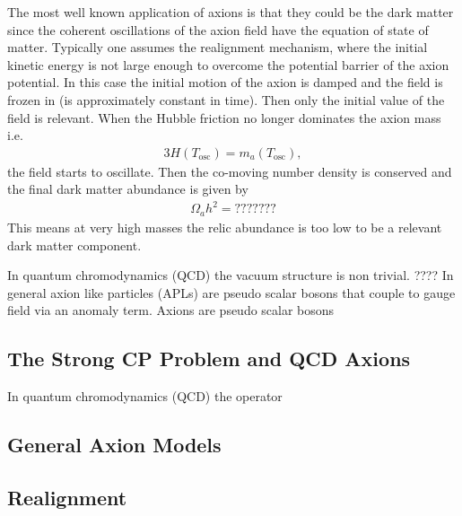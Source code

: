 \documentclass[13pt,a4paper,twoside,titlepage]{article}
\begin{document}
The most well known application of axions is that they could be the dark matter since
the coherent oscillations of the axion field have the equation of state of matter.
Typically one assumes the realignment mechanism, where the initial kinetic energy is not large enough to overcome the potential barrier of the axion potential. In this case the initial motion of the axion is damped and the field is frozen in (is approximately constant in time). Then only the initial value of the field is relevant.
When the Hubble friction no longer dominates the axion mass i.e.
\begin{align}
    3H(T_\mathrm{osc}) = m_a(T_\mathrm{osc}),
\end{align}
the field starts to oscillate.
Then the co-moving number density is conserved and the final dark matter abundance is given by
\begin{align}
    \Omega_a h^2 = ???????
\end{align}
This means at very high masses the relic abundance is too low to be a relevant dark matter component.

In quantum chromodynamics (QCD) the vacuum structure is non trivial.
????
In general axion like particles (APLs) are pseudo scalar bosons that couple
to gauge field via an anomaly term.
Axions are pseudo scalar bosons

\subsection{The Strong CP Problem and QCD Axions}
In quantum chromodynamics (QCD) the operator



\subsection{General Axion Models}

\subsection{Realignment}

\end{document}
